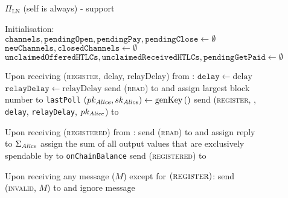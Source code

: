 \begin{figure}[!htbp]
\begin{protocolbox}{$\Pi_{\mathrm{LN}}$ (self is \alice{} always) - support}
  \begin{algorithmic}[1]
    \State Initialisation:
    \Indent
      \State $\mathtt{channels}, \mathtt{pendingOpen}, \mathtt{pendingPay},
      \mathtt{pendingClose} \gets \emptyset$
      \State $\mathtt{newChannels}, \mathtt{closedChannels} \gets \emptyset$
      \State $\mathtt{unclaimedOfferedHTLCs}, \mathtt{unclaimedReceivedHTLCs},
      \mathtt{pendingGetPaid} \gets \emptyset$
    \EndIndent
    \State

    \State Upon receiving (\textsc{register}, delay, relayDelay) from
    \environment:
    \Indent
      \State $\mathtt{delay} \gets \mathrm{delay}$
      \label{alg:protocol:support:delay}
      \State $\mathtt{relayDelay} \gets \mathrm{relayDelay}$
      \State send (\textsc{read}) to \ledger{} and assign largest block number
      to \texttt{lastPoll}
      \label{alg:protocol:support:lastpoll}
      \State $\left(pk_{\mathit{Alice}}, sk_{\mathit{Alice}}\right) \gets
      \mathrm{genKey}\left(\right)$
      \label{alg:protocol:support:keygen}
      \State send (\textsc{register}, \alice, \texttt{delay},
      \texttt{relayDelay}, $pk_{\mathit{Alice}}$) to \environment
    \EndIndent
    \State

    \State Upon receiving (\textsc{registered}) from \environment:
    \Indent
      \State send (\textsc{read}) to \ledger{} and assign reply to
      $\Sigma_{\mathit{Alice}}$
      \State assign the sum of all output values that are exclusively spendable
      by \alice{} to \texttt{onChainBalance}
      \State send (\textsc{registered}) to \environment
    \EndIndent
    \State

    \State Upon receiving any message ($M$) except for
    $\left(\textsc{register}\right)$:
    \Indent
        \State send (\textsc{invalid}, $M$) to \environment{} and ignore message
      \EndIf
    \EndIndent
    \State


\end{algorithmic}
\end{protocolbox}
\end{figure}
